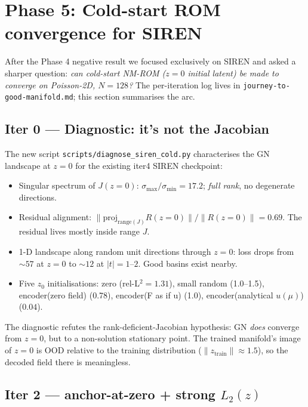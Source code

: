 \documentclass[11pt]{article}
\begin{document}
\section{Phase 5: Cold-start ROM convergence for SIREN}

After the Phase 4 negative result we focused exclusively on SIREN and
asked a sharper question: \emph{can cold-start NM-ROM ($z=0$ initial
latent) be made to converge on Poisson-2D, $N=128$?} The per-iteration
log lives in \texttt{journey-to-good-manifold.md}; this section
summarises the arc.

\subsection{Iter 0 --- Diagnostic: it's not the Jacobian}

The new script \texttt{scripts/diagnose\_siren\_cold.py} characterises
the GN landscape at $z=0$ for the existing iter4 SIREN checkpoint:

\begin{itemize}
\item Singular spectrum of $J(z=0)$: $\sigma_{\max}/\sigma_{\min}
      = 17.2$; \emph{full rank}, no degenerate directions.
\item Residual alignment: $\|\text{proj}_{\text{range}(J)} R(z=0)\|
      / \|R(z=0)\| = 0.69$. The residual lives mostly inside range $J$.
\item 1-D landscape along random unit directions through $z=0$:
      loss drops from $\sim 57$ at $z=0$ to $\sim 12$ at $|t|=1$--$2$.
      Good basins exist nearby.
\item Five $z_0$ initialisations: zero (rel-L${}^2=1.31$), small
      random (1.0--1.5), encoder(zero field) (0.78), encoder(F as if
      u) (1.0), encoder(analytical $u(\mu)$) ($\boldsymbol{0.04}$).
\end{itemize}

The diagnostic refutes the rank-deficient-Jacobian hypothesis: GN
\emph{does} converge from $z=0$, but to a non-solution stationary
point. The trained manifold's image of $z=0$ is OOD relative to the
training distribution ($\|z_{\text{train}}\| \approx 1.5$), so the
decoded field there is meaningless.

\subsection{Iter 2 --- anchor-at-zero + strong $L_2(z)$}
\end{document}
